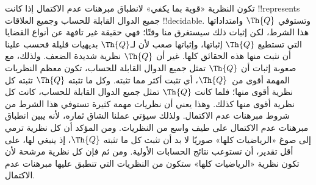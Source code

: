 \documentclass[../../../include/open-logic-section]{subfiles}
\begin{document}
تكون النظرية «قوية بما يكفي» لانطباق مبرهنات عدم الاكتمال إذا كانت
!!{represents} جميع الدوال القابلة للحساب وجميع العلاقات
!!{decidable}. وتستوفي $\Th{Q}$ وامتداداتها هذا الشرط، لكن إثبات ذلك
سيستغرق منا وقتًا؛ فهي حقيقة غير تافهة عن أنواع القضايا التي تستطيع
$\Th{Q}$ إثباتها، وإثباتها صعب لأن لـ$\Th{Q}$ بديهيات قليلة فحسب
علينا أن نثبت منها هذه الحقائق كلها. غير أن $\Th{Q}$ نظرية شديدة
الضعف. ولذلك، مع صعوبة إثبات أن $\Th{Q}$ تمثل جميع الدوال القابلة
للحساب، تكون معظم النظريات المهمة أقوى من~$\Th{Q}$، أي تثبت أكثر مما
تثبته. وكل ما تثبته $\Th{Q}$ تثبته كل نظرية أقوى منها؛ فلما كانت
$\Th{Q}$ تمثل جميع الدوال القابلة للحساب، كانت كل نظرية أقوى منها
كذلك. وهذا يعني أن نظريات مهمة كثيرة تستوفي هذا الشرط من شروط
مبرهنات عدم الاكتمال. ولذلك سيؤتي عملنا الشاق ثماره، لأنه يبين انطباق
مبرهنات عدم الاكتمال على طيف واسع من النظريات. ومن المؤكد أن كل نظرية
ترمي إلى صوغ «الرياضيات كلها» صوريًا لا بد أن تثبت كل ما تثبته
$\Th{Q}$، إذ ينبغي لها، على أقل تقدير، أن تستوعب نتائج الحسابات
الأولية. ومن ثم فإن كل نظرية مرشحة لأن تكون نظرية «الرياضيات كلها»
ستكون من النظريات التي تنطبق عليها مبرهنات عدم الاكتمال.
\end{document}
